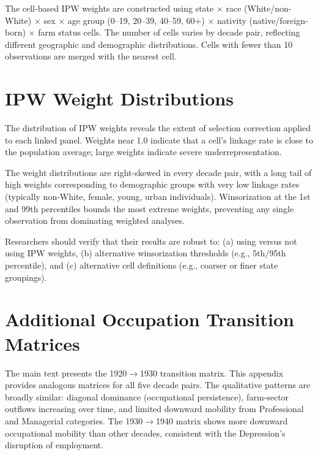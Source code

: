 \documentclass[12pt]{article}
\begin{document}
The cell-based IPW weights are constructed using state $\times$ race (White/non-White) $\times$ sex $\times$ age group (0--19, 20--39, 40--59, 60+) $\times$ nativity (native/foreign-born) $\times$ farm status cells. The number of cells varies by decade pair, reflecting different geographic and demographic distributions. Cells with fewer than 10 observations are merged with the nearest cell.


\section{IPW Weight Distributions}\label{app:ipw}

The distribution of IPW weights reveals the extent of selection correction applied to each linked panel. Weights near 1.0 indicate that a cell's linkage rate is close to the population average; large weights indicate severe underrepresentation.

The weight distributions are right-skewed in every decade pair, with a long tail of high weights corresponding to demographic groups with very low linkage rates (typically non-White, female, young, urban individuals). Winsorization at the 1st and 99th percentiles bounds the most extreme weights, preventing any single observation from dominating weighted analyses.

Researchers should verify that their results are robust to: (a) using versus not using IPW weights, (b) alternative winsorization thresholds (e.g., 5th/95th percentile), and (c) alternative cell definitions (e.g., coarser or finer state groupings).


\section{Additional Occupation Transition Matrices}\label{app:occ}

The main text presents the 1920$\rightarrow$1930 transition matrix. This appendix provides analogous matrices for all five decade pairs. The qualitative patterns are broadly similar: diagonal dominance (occupational persistence), farm-sector outflows increasing over time, and limited downward mobility from Professional and Managerial categories. The 1930$\rightarrow$1940 matrix shows more downward occupational mobility than other decades, consistent with the Depression's disruption of employment.
\end{document}
